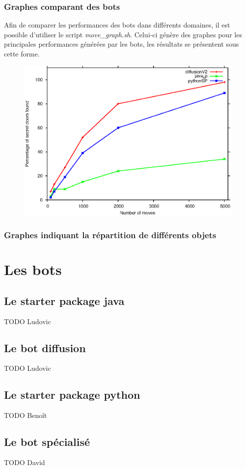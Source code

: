 \documentclass[10pt,a4paper]{report}
\begin{document}
\subsection{Graphes comparant des bots}
Afin de comparer les performances des bots dans différents domaines, il est
possible d'utiliser le script \emph{move\_graph.sh}. Celui-ci génère des
graphes pour les principales performances générées par les bots, les résultats
se présentent sous cette forme.

\begin{figure}[htb]
  \centering
  \includegraphics[width=120mm]{move_graph.eps}
\end{figure}

\subsection{Graphes indiquant la répartition de différents objets}

\chapter{Les bots}
\section{Le starter package java}
TODO Ludovic
\section{Le bot diffusion}
TODO Ludovic
\section{Le starter package python}
TODO Benoît
\section{Le bot spécialisé}
TODO David
\end{document}
